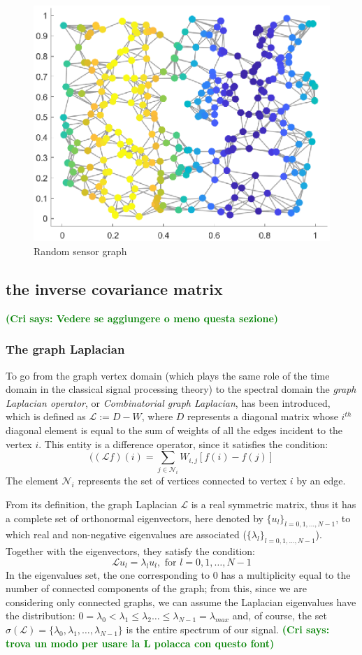 \documentclass[11pt,a4paper,titlepage]{article}
\newcommand{\cri}[1]{\textcolor{green}{\textbf{(Cri says: #1)}}}
\begin{document}
\begin{figure}
  \centering
  \includegraphics[width = .7\textwidth]{sampleGraph2.eps}
  \caption{Random sensor graph}
  \label{fig:sampleGraph}
\end{figure}
\subsection{the inverse covariance matrix}
\cri{Vedere se aggiungere o meno questa sezione}

\subsubsection{The graph Laplacian}
To go from the graph vertex domain (which plays the same role of the time domain in the classical signal processing theory) to the spectral domain the \textit{graph Laplacian operator}, or \textit{Combinatorial graph Laplacian}, has been introduced, which is defined as $\mathcal{L} := D - W$, where $D$ represents a diagonal matrix whose  $i^{th}$ diagonal element is equal to the sum of weights of all the edges incident to the vertex $i$. This entity is a difference operator, since it satisfies the condition:
\begin{equation}
((\mathcal{L} f)(i) = \sum_{j \in \mathcal{N}_i} W_{i,j}[f(i) - f(j)]
\end{equation}
The element $\mathcal{N}_i$ represents the set of vertices connected to vertex $i$ by an edge.

From its definition, the graph Laplacian $\mathcal{L}$ is a real symmetric matrix, thus it has a complete set of orthonormal eigenvectors, here denoted by $\{u_l\}_{l=0,1,\dots,N-1}$, to which real and non-negative eigenvalues are associated ($\{\lambda_l\}_{l=0,1,\dots,N-1}$). Together with the eigenvectors, they satisfy the condition:
\begin{equation}
\mathcal{L} u_l = \lambda_l u_l, \text{   for  } l = 0,1,\dots,N-1
\end{equation}
In the eigenvalues set, the one corresponding to $0$ has a multiplicity equal to the number of connected components of the graph; from this, since we are considering only connected graphs, we can assume the Laplacian eigenvalues have the distribution: $0 = \lambda_0 < \lambda_1 \leq \lambda_2 \dots \leq \lambda_{N-1} = \lambda_{max}$ and, of course, the set $\sigma(\mathcal{L}) = \{\lambda_0, \lambda_1,\dots,\lambda_{N-1}\}$ is the entire spectrum of our signal. \cri{trova un modo per usare la L polacca con questo font}
\end{document}
